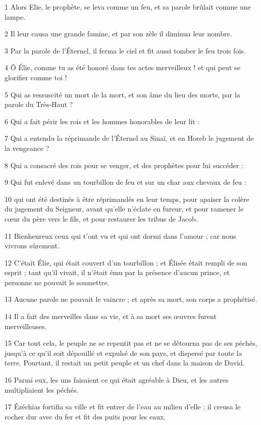 \par 1 Alors Elie, le prophète, se leva comme un feu, et sa parole brûlait comme une lampe.
\par 2 Il leur causa une grande famine, et par son zèle il diminua leur nombre.
\par 3 Par la parole de l'Éternel, il ferma le ciel et fit aussi tomber le feu trois fois.
\par 4 Ô Élie, comme tu as été honoré dans tes actes merveilleux ! et qui peut se glorifier comme toi !
\par 5 Qui as ressuscité un mort de la mort, et son âme du lieu des morts, par la parole du Très-Haut ?
\par 6 Qui a fait périr les rois et les hommes honorables de leur lit :
\par 7 Qui a entendu la réprimande de l'Éternel au Sinaï, et en Horeb le jugement de la vengeance ?
\par 8 Qui a consacré des rois pour se venger, et des prophètes pour lui succéder :
\par 9 Qui fut enlevé dans un tourbillon de feu et sur un char aux chevaux de feu :
\par 10 qui ont été destinés à être réprimandés en leur temps, pour apaiser la colère du jugement du Seigneur, avant qu'elle n'éclate en fureur, et pour ramener le cœur du père vers le fils, et pour restaurer les tribus de Jacob.
\par 11 Bienheureux ceux qui t'ont vu et qui ont dormi dans l'amour ; car nous vivrons sûrement.
\par 12 C'était Élie, qui était couvert d'un tourbillon ; et Élisée était rempli de son esprit ; tant qu'il vivait, il n'était ému par la présence d'aucun prince, et personne ne pouvait le soumettre.
\par 13 Aucune parole ne pouvait le vaincre ; et après sa mort, son corps a prophétisé.
\par 14 Il a fait des merveilles dans sa vie, et à sa mort ses œuvres furent merveilleuses.
\par 15 Car tout cela, le peuple ne se repentit pas et ne se détourna pas de ses péchés, jusqu'à ce qu'il soit dépouillé et expulsé de son pays, et dispersé par toute la terre. Pourtant, il restait un petit peuple et un chef dans la maison de David.
\par 16 Parmi eux, les uns faisaient ce qui était agréable à Dieu, et les autres multipliaient les péchés.
\par 17 Ézéchias fortifia sa ville et fit entrer de l'eau au milieu d'elle ; il creusa le rocher dur avec du fer et fit des puits pour les eaux.
